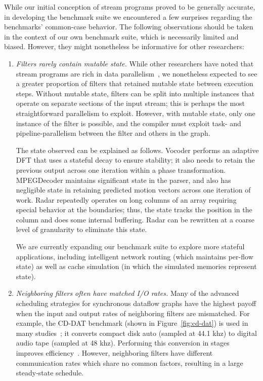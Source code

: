 While our initial conception of stream programs proved to be generally
accurate, in developing the benchmark suite we encountered a few
surprises regarding the benchmarks' common-case behavior.  The
following observations should be taken in the context of our own
benchmark suite, which is necessarily limited and biased.  However,
they might nonetheless be informative for other researchers:

\begin{enumerate}

\item {\it Filters rarely contain mutable state.}  While other
  researchers have noted that stream programs are rich in data
  parallelism~\cite{imagine03ieee}, we nonetheless expected to see a
  greater proportion of filters that retained mutable state between
  execution steps.  Without mutable state, filters can be split into
  multiple instances that operate on separate sections of the input
  stream; this is perhaps the most straightforward parallelism to
  exploit.  However, with mutable state, only one instance of the
  filter is possible, and the compiler must exploit task- and
  pipeline-parallelism between the filter and others in the graph.

  The state observed can be explained as follows.  Vocoder performs an
  adaptive DFT that uses a stateful decay to ensure stability; it also
  needs to retain the previous output across one iteration within a
  phase transformation.  MPEGDecoder maintains significant state in
  the parser, and also has negligible state in retaining predicted
  motion vectors across one iteration of work.  Radar repeatedly
  operates on long columns of an array requiring special behavior at
  the boundaries; thus, the state tracks the position in the column
  and does some internal buffering.  Radar can be rewritten at a
  coarse level of granularity to eliminate this state.

  We are currently expanding our benchmark suite to explore more
  stateful applications, including intelligent network routing (which
  maintains per-flow state) as well as cache simulation (in which the
  simulated memories represent state).

\item {\it Neighboring filters often have matched I/O rates.}  Many of
  the advanced scheduling strategies for synchronous dataflow graphs
  have the highest payoff when the input and output rates of
  neighboring filters are mismatched.  For example, the CD-DAT
  benchmark (shown in Figure~\ref{fig:cd-dat}) is used in many
  studies~\cite{murthy_minimizing_1994,bhattacharyya_optimal_1995,teich_3d_1999,bhattacharya_quasi-static_2000,chandrachoodan_efficient_2001,murthy_buffer_2004,ko_memory-constrained_2006};
  it converts compact disk auto (sampled at 44.1 khz) to digital audio
  tape (sampled at 48 khz).  Performing this conversion in stages
  improves efficiency~\cite{murthy_minimizing_1994}.  However,
  neighboring filters have different communication rates which share
  no common factors, resulting in a large steady-state schedule.


\end{enumerate}
